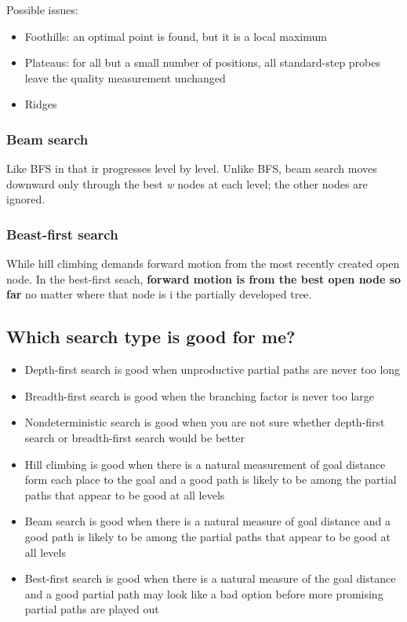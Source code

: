 \documentclass{article}
\begin{document}
Possible issues:
\begin{itemize}
  \item Foothills: an optimal point is found, but it is a local maximum
  \item Plateaus: for all but a small number of positions, all standard-step
    probes leave the quality measurement unchanged
  \item Ridges
\end{itemize}

\subsubsection{Beam search}

Like BFS in that ir progresses level by level. Unlike BFS, beam 
search moves downward only through the best \textit{w} 
nodes at each level; the other nodes are ignored.

\subsubsection{Beast-first search}

While hill climbing demands forward motion from the most recently created
open node. In the best-first seach, \textbf{forward motion is 
from the best open node so far} no matter where that node is i the
partially developed tree.

\subsection{Which search type is good for me?}
\begin{itemize}
  \item Depth-first search is good when unproductive partial
    paths are never too long
  \item Breadth-first search is good when the branching 
    factor is never too large
  \item Nondeterministic search is good when you are not sure whether
    depth-first search or breadth-first search would be better
  \item Hill climbing is good when there is a natural measurement
    of goal distance form each place to the goal and a good path is 
    likely to be among the partial paths that appear to be good at
    all levels
  \item Beam search is good when there is a natural measure of
    goal distance and a good path is likely to be among the 
    partial paths that appear to be good at all levels
  \item Best-first search is good when there is a natural measure 
    of the goal distance and a good partial path may look like
    a bad option before more promising partial paths are played
    out
\end{itemize}
\end{document}

